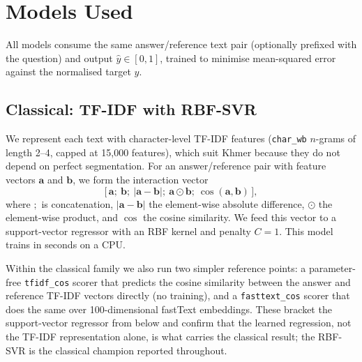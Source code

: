 \section{Models Used}
\label{sec:pillars}
All models consume the same answer/reference text pair (optionally prefixed with the question) and
output $\hat{y}\in[0,1]$, trained to minimise mean-squared error against the normalised target $y$.

\subsection{Classical: TF-IDF with RBF-SVR}
We represent each text with character-level TF-IDF features (\texttt{char\_wb} $n$-grams of length
2--4, capped at 15{,}000 features), which suit Khmer because they do not depend on perfect
segmentation. For an answer/reference pair with feature vectors $\mathbf{a}$ and $\mathbf{b}$, we form
the interaction vector
\begin{equation}
\big[\,\mathbf{a};\ \mathbf{b};\ |\mathbf{a}-\mathbf{b}|;\ \mathbf{a}\odot\mathbf{b};\
\cos(\mathbf{a},\mathbf{b})\,\big],
\end{equation}
where $;$ is concatenation, $|\mathbf{a}-\mathbf{b}|$ the element-wise absolute difference, $\odot$ the
element-wise product, and $\cos$ the cosine similarity. We feed this vector to a support-vector
regressor with an RBF kernel and penalty $C=1$. This model trains in seconds on a CPU.

Within the classical family we also run two simpler reference points: a parameter-free
\texttt{tfidf\_cos} scorer that predicts the cosine similarity between the answer and reference TF-IDF
vectors directly (no training), and a \texttt{fasttext\_cos} scorer that does the same over
100-dimensional fastText embeddings. These bracket the support-vector regressor from below and confirm
that the learned regression, not the TF-IDF representation alone, is what carries the classical result;
the RBF-SVR is the classical champion reported throughout.

